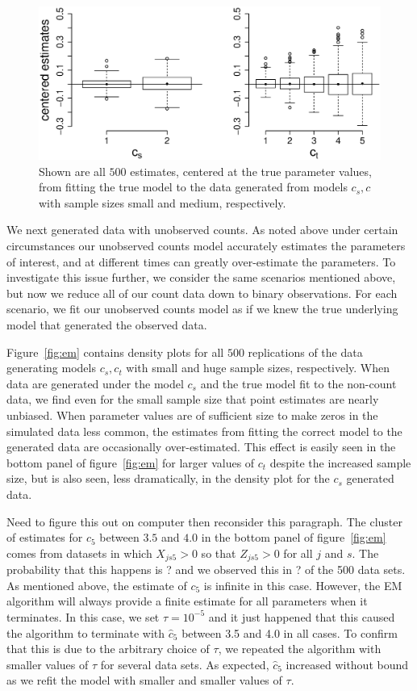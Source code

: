 \begin{figure}
  \centering
  \includegraphics[scale=0.5]{bp}
  \caption{Shown are all $500$ estimates, centered at the true parameter values, from fitting the true model to the data generated from models $c_s,c$ with sample sizes small and medium, respectively.}
  \label{fig:bp}
\end{figure}

We next generated data with unobserved counts.  As noted above under certain circumstances our unobserved counts model accurately estimates the parameters of interest, and at different times can greatly over-estimate the parameters.  To investigate this issue further, we consider the same scenarios mentioned above, but now we reduce all of our count data down to binary observations.  For each scenario, we fit our unobserved counts model as if we knew the true underlying model that generated the observed data.

Figure~\ref{fig:em} contains density plots for all $500$ replications of the data generating models $c_s,c_t$ with small and huge sample sizes, respectively.  When data are generated under the model $c_s$ and the true model fit to the non-count data, we find even for the small sample size that point estimates are nearly unbiased.  When parameter values are of sufficient size to make zeros in the simulated data less common, the estimates from fitting the correct model to the generated data are occasionally over-estimated.  This effect is easily seen in the bottom panel of figure~\ref{fig:em} for larger values of $c_t$ despite the increased sample size, but is also seen, less dramatically, in the density plot for the $c_s$ generated data.  

{\color{red} Need to figure this out on computer then reconsider this paragraph.} The cluster of estimates for $c_5$ between $3.5$ and $4.0$ in the bottom panel of figure~\ref{fig:em} comes from datasets in which $X_{js5}>0$ so that $Z_{js5}>0$ for all $j$ and $s$. The probability that this happens is ? and we observed this in ? of the 500 data sets. As mentioned above, the estimate of $c_5$ is infinite in this case. However, the EM algorithm will always provide a finite estimate for all parameters when it terminates. In this case, we set $\tau=10^{-5}$ and it just happened that this caused the algorithm to terminate with $\hat c_5$ between 3.5 and 4.0 in all cases. To confirm that this is due to the arbitrary choice of $\tau$, we repeated the algorithm with smaller values of $\tau$ for several data sets. As expected, $\hat c_5$ increased without bound as we refit the model with smaller and smaller values of $\tau$.

